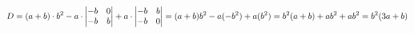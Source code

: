 \documentclass[preview]{standalone}
\begin{document}
\begin{align*}
\special{dvisvgm:raw <g id='unique000'>}D=(a+b)\cdot b^2-a\cdot\begin{vmatrix}-b&0\\-b&b\end{vmatrix}+a\cdot\begin{vmatrix}-b&b\\-b&0\end{vmatrix}=(a+b)b^2-a(-b^2)+a(b^2)=b^2(a+b)+ab^2+ab^2=b^2(3a+b)\special{dvisvgm:raw </g>}
\end{align*}
\end{document}
